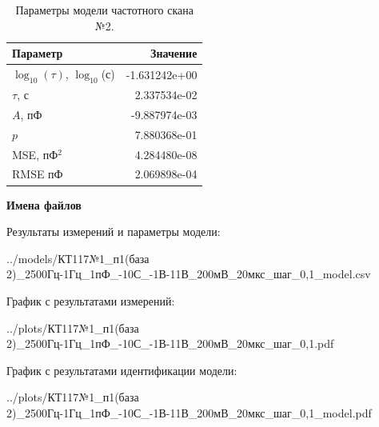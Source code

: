 \begin{table}[!ht]
    \centering
    \caption{Параметры модели частотного скана №2.}
    \begin{tabular}{|l|r|}
        \hline
        Параметр                                       & Значение                  \\ \hline
        $\log_{10}(\tau)$, $\log_{10}$(с)              & -1.631242e+00             \\ \hline
        $\tau$, с                                      & 2.337534e-02              \\ \hline
        $A$, пФ                                        & -9.887974e-03             \\ \hline
        $p$                                            & 7.880368e-01              \\ \hline
        MSE, пФ$^2$                                    & 4.284480e-08              \\ \hline
        RMSE пФ                                        & 2.069898e-04              \\ \hline
    \end{tabular}
    \label{table:frequency_scan_model_2}
\end{table}

\textbf{Имена файлов}

Результаты измерений и параметры модели:

\scriptsize../models/КТ117№1\_п1(база 2)\_2500Гц-1Гц\_1пФ\_-10С\_-1В-11В\_200мВ\_20мкс\_шаг\_0,1\_model.csv
\normalsize

График с результатами измерений:

\scriptsize../plots/КТ117№1\_п1(база 2)\_2500Гц-1Гц\_1пФ\_-10С\_-1В-11В\_200мВ\_20мкс\_шаг\_0,1.pdf
\normalsize

График с результатами идентификации модели:

\scriptsize../plots/КТ117№1\_п1(база 2)\_2500Гц-1Гц\_1пФ\_-10С\_-1В-11В\_200мВ\_20мкс\_шаг\_0,1\_model.pdf
\normalsize

